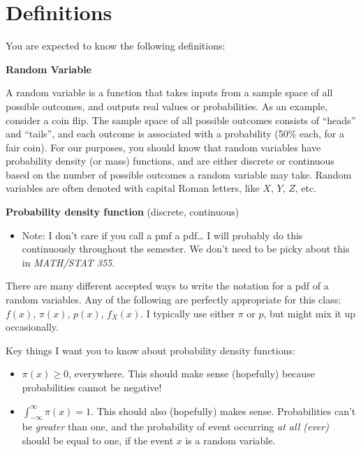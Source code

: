 \documentclass[
  letterpaper,
  DIV=11,
  numbers=noendperiod]{scrreprt}
\providecommand{\tightlist}{%
  \setlength{\itemsep}{0pt}\setlength{\parskip}{0pt}}\usepackage{longtable,booktabs,array}
\begin{document}
\section{Definitions}\label{definitions}

You are expected to know the following definitions:

\textbf{Random Variable}

A random variable is a function that takes inputs from a sample space of
all possible outcomes, and outputs real values or probabilities. As an
example, consider a coin flip. The sample space of all possible outcomes
consists of ``heads'' and ``tails'', and each outcome is associated with
a probability (50\% each, for a fair coin). For our purposes, you should
know that random variables have probability density (or mass) functions,
and are either discrete or continuous based on the number of possible
outcomes a random variable may take. Random variables are often denoted
with capital Roman letters, like \(X\), \(Y\), \(Z\), etc.

\textbf{Probability density function} (discrete, continuous)

\begin{itemize}
\tightlist
\item
  Note: I don't care if you call a pmf a pdf\ldots{} I will probably do
  this continuously throughout the semester. We don't need to be picky
  about this in \emph{MATH/STAT 355}.
\end{itemize}

There are many different accepted ways to write the notation for a pdf
of a random variables. Any of the following are perfectly appropriate
for this class: \(f(x)\), \(\pi(x)\), \(p(x)\), \(f_X(x)\). I typically
use either \(\pi\) or \(p\), but might mix it up occasionally.

Key things I want you to know about probability density functions:

\begin{itemize}
\item
  \(\pi(x) \geq 0\), everywhere. This should make sense (hopefully)
  because probabilities cannot be negative!
\item
  \(\int_{-\infty}^\infty \pi(x) = 1\). This should also (hopefully)
  makes sense. Probabilities can't be \emph{greater} than one, and the
  probability of event occurring \emph{at all (ever)} should be equal to
  one, if the event \(x\) is a random variable.
\end{itemize}
\end{document}
